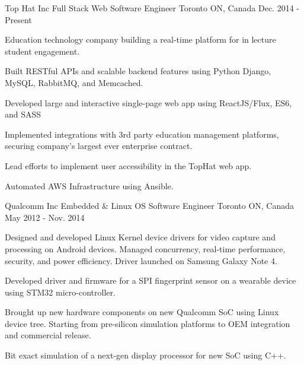 

\begin{cventries}

  \cventry
    {Top Hat Inc} %
    {Full Stack Web Software Engineer} %
    {Toronto ON, Canada} %
    {Dec. 2014 - Present} %
    {
      \vspace{6mm}
      {Education technology company building a real-time platform for in lecture student engagement.}
      \begin{cvitems} %
        \item {Built RESTful APIs and scalable backend features using Python Django, MySQL, RabbitMQ, and Memcached.}
        \item {Developed large and interactive single-page web app using ReactJS/Flux, ES6, and SASS}
        \item {Implemented integrations with 3rd party education management platforms, securing company's largest ever enterprise contract.}
        \item {Lead efforts to implement user accessibility in the TopHat web app.}
        \item {Automated AWS Infrastructure using Ansible.}
      \end{cvitems}
    }

  \cventry
    {Qualcomm Inc} %
	{Embedded \& Linux OS Software Engineer} %
    {Toronto ON, Canada} %
    {May 2012 - Nov. 2014} %
    {
      \begin{cvitems} %
        \item {Designed and developed Linux Kernel device drivers for video capture and processing on Android devices. Managed concurrency, real-time performance, security, and power efficiency. Driver launched on Samsung Galaxy Note 4.}
        \item {Developed driver and firmware for a SPI fingerprint sensor on a wearable device using STM32 micro-controller.}
        \item {Brought up new hardware components on new Qualcomm SoC using Linux device tree. Starting from  pre-silicon simulation platforms to OEM integration and commercial release.}
        \item {Bit exact simulation of a next-gen display processor for new SoC using C++.}
      \end{cvitems}
    }


\end{cventries}
